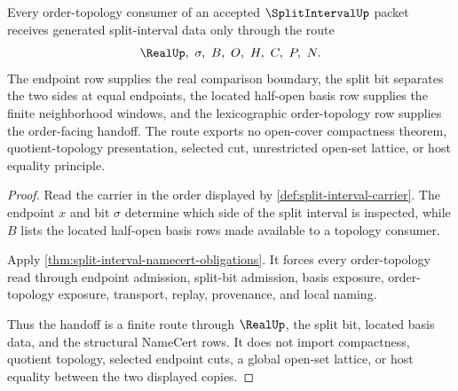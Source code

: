 \begin{theorem}
\label{thm:split-interval-order-topology-handoff}
Every order-topology consumer of an accepted $\SplitIntervalUp$ packet receives generated split-interval data only through the route
$$
\RealUp,\ \sigma,\ B,\ O,\ H,\ C,\ P,\ N .
$$
The endpoint row supplies the real comparison boundary, the split bit separates the two sides at equal endpoints, the located half-open basis row supplies the finite neighborhood windows, and the lexicographic order-topology row supplies the order-facing handoff. The route exports no open-cover compactness theorem, quotient-topology presentation, selected cut, unrestricted open-set lattice, or host equality principle.
\end{theorem}
\begin{proof}
Read the carrier in the order displayed by \autoref{def:split-interval-carrier}. The endpoint $x$ and bit $\sigma$ determine which side of the split interval is inspected, while $B$ lists the located half-open basis rows made available to a topology consumer.

Apply \autoref{thm:split-interval-namecert-obligations}. It forces every order-topology read through endpoint admission, split-bit admission, basis exposure, order-topology exposure, transport, replay, provenance, and local naming.

Thus the handoff is a finite route through $\RealUp$, the split bit, located basis data, and the structural NameCert rows. It does not import compactness, quotient topology, selected endpoint cuts, a global open-set lattice, or host equality between the two displayed copies.
\end{proof}





